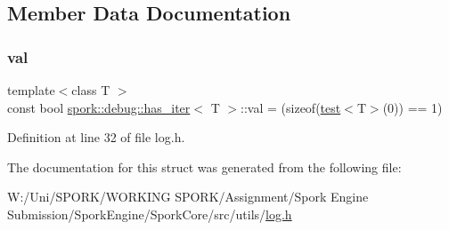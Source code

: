 \subsection{Member Data Documentation}
\mbox{\label{structspork_1_1debug_1_1has__iter_a895266ecb40a2fbf23b47f4a78b0cd39}} 
\subsubsection{\texorpdfstring{val}{val}}
{\footnotesize\ttfamily template$<$class T $>$ \\
const bool \hyperlink{structspork_1_1debug_1_1has__iter}{spork\+::debug\+::has\+\_\+iter}$<$ T $>$\+::val = (sizeof(\hyperlink{structspork_1_1debug_1_1has__iter_a456c43f8ffe6dc2c0e43646ee103573b}{test}$<$T$>$(0)) == 1)\hspace{0.3cm}{\ttfamily [static]}}



Definition at line 32 of file log.\+h.



The documentation for this struct was generated from the following file\+:\begin{DoxyCompactItemize}
\item 
W\+:/\+Uni/\+S\+P\+O\+R\+K/\+W\+O\+R\+K\+I\+N\+G S\+P\+O\+R\+K/\+Assignment/\+Spork Engine Submission/\+Spork\+Engine/\+Spork\+Core/src/utils/\hyperlink{log_8h}{log.\+h}\end{DoxyCompactItemize}
